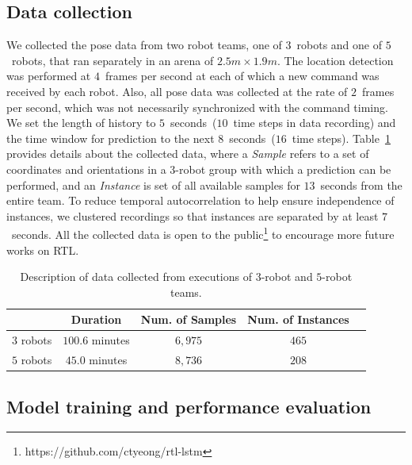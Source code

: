 \documentclass[letterpaper, 10 pt, conference]{ieeeconf}  %
\begin{document}
    \subsection{Data collection}

    We collected the pose data from two robot teams, one of
    $3$~robots and one of $5$~robots, that ran separately in an arena of
    $2.5 m \times 1.9 m$. The location detection was performed at
    $4$~frames per second at each of which a new command was received by
    each robot. Also, all pose data was collected at the rate of
    $2$~frames per second, which was not necessarily synchronized with
    the command timing. We set the length of history to
    $5$~seconds~($10$~time steps in data recording) and the time window
    for prediction to the next $8$~seconds~($16$~time steps).
    Table~\ref{table:data_description} provides details about the
    collected data, where a \emph{Sample} refers to a set of coordinates and
    orientations in a 3-robot group with which a prediction can be
    performed, and an \emph{Instance} is set of all available samples
    for $13$~seconds from the entire team. To reduce temporal
    autocorrelation to help ensure independence of instances, we
    clustered recordings so that instances are separated by at least
    $7$~seconds. All the collected data is open to the 
    public\footnote{https://github.com/ctyeong/rtl-lstm}
    to encourage more future works on RTL.
	\setlength{\tabcolsep}{0.5em} %
	{\renewcommand{\arraystretch}{1.2}%
		\begin{table}[t]
			\centering
			\begin{tabular}{|c|c|c|c|c|}
				\hline
							&  Duration & Num. of Samples & Num. of Instances  \\ \hline
				$3$ robots & $100.6$ minutes & $6,975$ & $465$  \\ \hline
				$5$ robots & $45.0$ minutes  & $8,736$ & $208$  \\ \hline
			\end{tabular}
			\caption{Description of data collected from executions of $3$-robot and $5$-robot teams.}
			\label{table:data_description}
		\end{table}
	}

    \subsection{Model training and performance evaluation}
\end{document}
